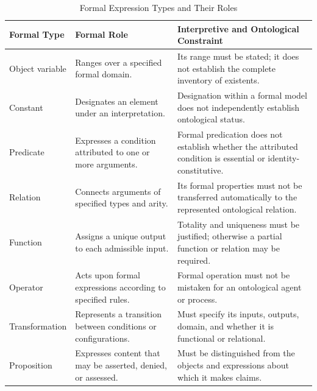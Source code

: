
\begin{table}[htbp]
\centering
\small
\caption{Formal Expression Types and Their Roles}
\label{tab:ch07_formal_types}
\renewcommand{\arraystretch}{1.25}
\begin{tabularx}{\textwidth}{|p{}|p{}|X|}
\hline
\textbf{Formal Type} &
\textbf{Formal Role} &
\textbf{Interpretive and Ontological Constraint}
\\
\hline
Object variable &
Ranges over a specified formal domain. &
Its range must be stated; it does not establish the complete inventory of existents.
\\
\hline
Constant &
Designates an element under an interpretation. &
Designation within a formal model does not independently establish ontological status.
\\
\hline
Predicate &
Expresses a condition attributed to one or more arguments. &
Formal predication does not establish whether the attributed condition is essential or identity-constitutive.
\\
\hline
Relation &
Connects arguments of specified types and arity. &
Its formal properties must not be transferred automatically to the represented ontological relation.
\\
\hline
Function &
Assigns a unique output to each admissible input. &
Totality and uniqueness must be justified; otherwise a partial function or relation may be required.
\\
\hline
Operator &
Acts upon formal expressions according to specified rules. &
Formal operation must not be mistaken for an ontological agent or process.
\\
\hline
Transformation &
Represents a transition between conditions or configurations. &
Must specify its inputs, outputs, domain, and whether it is functional or relational.
\\
\hline
Proposition &
Expresses content that may be asserted, denied, or assessed. &
Must be distinguished from the objects and expressions about which it makes claims.
\\
\hline
\end{tabularx}
\end{table}

